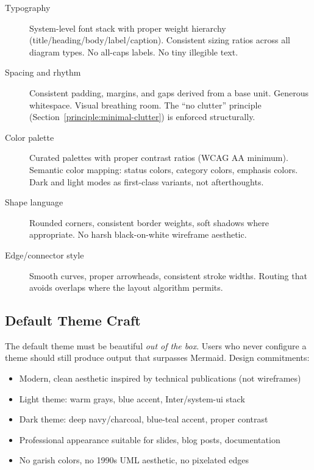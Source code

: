 \begin{description}
  \item[Typography] System-level font stack with proper weight hierarchy
        (title/heading/body/label/caption). Consistent sizing ratios across all diagram types.
        No all-caps labels. No tiny illegible text.

  \item[Spacing and rhythm] Consistent padding, margins, and gaps derived from a base unit.
        Generous whitespace. Visual breathing room. The ``no clutter'' principle
        (Section~\ref{principle:minimal-clutter}) is enforced structurally.

  \item[Color palette] Curated palettes with proper contrast ratios (WCAG AA minimum).
        Semantic color mapping: status colors, category colors, emphasis colors.
        Dark and light modes as first-class variants, not afterthoughts.

  \item[Shape language] Rounded corners, consistent border weights, soft shadows where
        appropriate. No harsh black-on-white wireframe aesthetic.

  \item[Edge/connector style] Smooth curves, proper arrowheads, consistent stroke widths.
        Routing that avoids overlaps where the layout algorithm permits.
\end{description}

\subsection{Default Theme Craft}

The default theme must be beautiful \emph{out of the box}. Users who never configure a theme
should still produce output that surpasses Mermaid. Design commitments:

\begin{itemize}
  \item Modern, clean aesthetic inspired by technical publications (not wireframes)
  \item Light theme: warm grays, blue accent, Inter/system-ui stack
  \item Dark theme: deep navy/charcoal, blue-teal accent, proper contrast
  \item Professional appearance suitable for slides, blog posts, documentation
  \item No garish colors, no 1990s UML aesthetic, no pixelated edges
\end{itemize}

